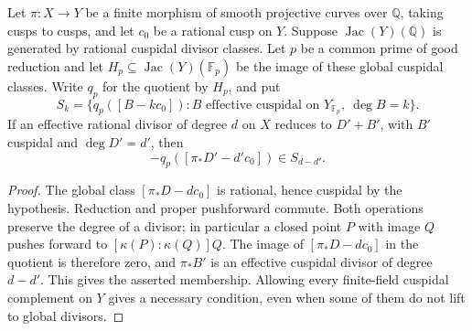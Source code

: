 \begin{lemma}\label{lem:octic-quotient-cusps}
Let $\pi:X\longrightarrow Y$ be a finite morphism of smooth projective
curves over $\mathbb Q$, taking cusps to cusps, and let $c_0$ be a
rational cusp on $Y$. Suppose $\operatorname{Jac}(Y)(\mathbb Q)$ is
generated by rational cuspidal divisor classes. Let $p$ be a common
prime of good reduction and let $H_p\subseteq\operatorname{Jac}(Y)(\mathbb F_p)$
be the image of these global cuspidal classes. Write $q_p$ for the
quotient by $H_p$, and put
\[
 S_k=\{q_p([B-kc_0]): B\text{ effective cuspidal on }Y_{\mathbb F_p},
 \ \deg B=k\}.
\]
If an effective rational divisor of degree $d$ on $X$ reduces to
$D'+B'$, with $B'$ cuspidal and $\deg D'=d'$, then
\[
 -q_p([\pi_*D'-d'c_0])\in S_{d-d'}.
\]
\end{lemma}
\begin{proof}
The global class $[\pi_*D-dc_0]$ is rational, hence cuspidal by the
hypothesis. Reduction and proper pushforward commute. Both operations
preserve the degree of a divisor; in particular a closed point $P$
with image $Q$ pushes forward to $[\kappa(P):\kappa(Q)]Q$.
The image of $[\pi_*D-dc_0]$ in the quotient is therefore zero, and
$\pi_*B'$ is an effective cuspidal divisor of degree $d-d'$.
This gives the asserted membership. Allowing every finite-field
cuspidal complement on $Y$ gives a necessary condition, even when
some of them do not lift to global divisors.
\end{proof}
